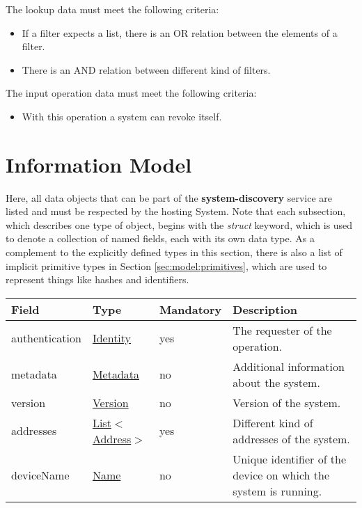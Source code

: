 \documentclass[a4paper]{arrowhead}
\newcommand{\pref}[1]{{\textcolor{ArrowheadGrey}{\hyperref[sec:model:primitives:#1]{#1}}}}
\begin{document}

The lookup data must meet the following criteria:

\begin{itemize}
    \item If a filter expects a list, there is an OR relation between the elements of a filter.
    \item There is an AND relation between different kind of filters.
\end{itemize}


The input operation data must meet the following criteria:

\begin{itemize}
    \item With this operation a system can revoke itself.
\end{itemize}


\clearpage

\section{Information Model}
\label{sec:model}

Here, all data objects that can be part of the \textbf{system-discovery} service are listed and must be respected by the hosting System.
Note that each subsection, which describes one type of object, begins with the \textit{struct} keyword, which is used to denote a collection of named fields, each with its own data type.
As a complement to the explicitly defined types in this section, there is also a list of implicit primitive types in Section \ref{sec:model:primitives}, which are used to represent things like hashes and identifiers.

\label{sec:model:SystemRegistrationRequest}
 
\begin{table}[ht!]
\begin{tabularx}{\textwidth}{| p{3cm} | p{3cm} | p{2cm} | X |} \hline
\rowcolor{gray!33} Field & Type & Mandatory & Description \\ \hline
authentication & \hyperref[sec:model:Identity]{Identity} & yes & The requester of the operation. \\ \hline
metadata &\hyperref[sec:model:Metadata]{Metadata} & no & Additional information about the system. \\ \hline
version &\pref{Version} & no & Version of the system. \\ \hline
addresses &  \pref{List}$<$\pref{Address}$>$ & yes & Different kind of addresses of the system.  \\ \hline
deviceName & \pref{Name} & no & Unique identifier of the device on which the system is running. \\ \hline
\end{tabularx}
\end{table}
\end{document}
